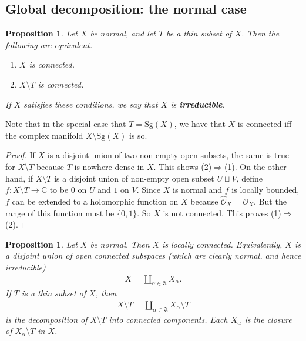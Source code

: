 \documentclass[12pt,b5paper,notitlepage]{report}
\theoremstyle{definition}
\theoremstyle{plain}
\newtheorem{pp}[df]{Proposition}
\newcommand{\fk}{\mathfrak}
\newcommand{\scr}{\mathscr}
\newcommand{\Cbb}{\mathbb C}
\newcommand{\Sg}{\mathrm{Sg}}
\newcommand{\Owht}{\widehat{\scr O}}
\numberwithin{equation}{section}
\begin{document}
\subsection{Global decomposition: the normal case}

\begin{pp}\label{lb234}
Let $X$ be normal, and let $T$ be a thin subset of $X$. Then the following are equivalent.
\begin{enumerate}[label=(\arabic*)]
\item $X$ is connected.
\item $X\setminus T$ is connected.
\end{enumerate}
If $X$ satisfies these conditions, we say that $X$ is \textbf{irreducible}. 
\end{pp}

Note that in the special case that $T=\Sg(X)$, we have that $X$ is connected iff the complex manifold $X\setminus\Sg(X)$ is so.


\begin{proof}
If $X$ is a disjoint union of two non-empty open subsets, the same is true for $X\setminus T$ because $T$ is nowhere dense in $X$. This shows (2)$\Rightarrow$(1). On the other hand, if $X\setminus T$ is a disjoint union of non-empty open subset $U\sqcup V$, define $f:X\setminus T\rightarrow\Cbb$ to be $0$ on $U$ and $1$ on $V$. Since $X$ is normal and $f$ is locally bounded, $f$ can be extended to a holomorphic function on $X$ because $\Owht_X=\scr O_X$. But the range of this function must be $\{0,1\}$. So $X$ is not connected. This proves (1)$\Rightarrow$(2).
\end{proof}






\begin{pp}\label{lb237}
Let $X$ be normal. Then $X$ is locally connected. Equivalently, $X$ is a disjoint union of open connected subspaces (which are clearly normal, and hence irreducible)
\begin{align}
X=\coprod_{\alpha\in\fk A} X_\alpha. \label{eq97}
\end{align}
If $T$ is a thin subset of $X$, then 
\begin{align}
X\setminus T=\coprod_{\alpha\in\fk A}X_\alpha\setminus T  \label{eq98}
\end{align}
is the  decomposition of $X\setminus T$ into connected components.  Each $X_\alpha$ is the closure of $X_\alpha\setminus T$ in $X$.
\end{pp}
\end{document}
